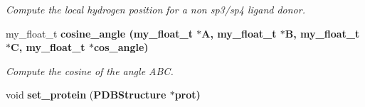 \begin{CompactItemize}
\begin{CompactList}\small\item\em Compute the local hydrogen position for a non sp3/sp4 ligand donor. \item\end{CompactList}\item 
my\_\-float\_\-t \bf{cosine\_\-angle} (my\_\-float\_\-t $\ast$A, my\_\-float\_\-t $\ast$B, my\_\-float\_\-t $\ast$C, my\_\-float\_\-t $\ast$cos\_\-angle)\label{classSimSite3D_1_1HbondGeometry_f331b8cf86d1b6d75a1d9002cc728cde}

\begin{CompactList}\small\item\em Compute the cosine of the angle ABC. \item\end{CompactList}\item 
void \textbf{set\_\-protein} (\bf{PDBStructure} $\ast$prot)\label{classSimSite3D_1_1HbondGeometry_cffbb708f35a814d4cfd8102b8f4d19c}

\end{CompactItemize}
